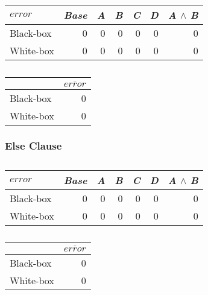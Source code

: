 \begin{table}[H]
\begin{minipage}{.5\linewidth}
    \centering
    \begin{tabular}{lrrrrrr}    \toprule
    $error$     & \emph{Base} & \emph{A} & \emph{B} & \emph{C} & \emph{D} & \emph{A} $\land$ \emph{B}   \\ \midrule
    Black-box & 0 & 0 & 0 & 0 & 0 & 0      \\
    White-box & 0 & 0 & 0 & 0 & 0 & 0      \\ \bottomrule
    \end{tabular}
    \caption{}
\end{minipage}%
\hspace{7mm}
\begin{minipage}{.3\linewidth}
    \centering
    \begin{tabular}{lr}
        \toprule
                  & $\overline{error}$   \\ \midrule
        Black-box & 0              \\
        White-box & 0              \\ \bottomrule
        \end{tabular}  
        \caption{}
    \end{minipage}
\end{table}

\subsubsection*{Else Clause}

\begin{table}[H]
    \begin{minipage}{.5\linewidth}
        \centering
        \begin{tabular}{lrrrrrr}    \toprule
        $error$    & \emph{Base} & \emph{A} & \emph{B} & \emph{C} & \emph{D} & \emph{A} $\land$ \emph{B}   \\ \midrule
        Black-box & 0 & 0 & 0 & 0 & 0 & 0      \\
        White-box & 0 & 0 & 0 & 0 & 0 & 0      \\ \bottomrule
        \end{tabular}
        \caption{}
    \end{minipage}%
    \hspace{7mm}
    \begin{minipage}{.3\linewidth}
        \centering
        \begin{tabular}{lr}
            \toprule
                      & $\overline{error}$   \\ \midrule
            Black-box & 0              \\
            White-box & 0              \\ \bottomrule
            \end{tabular} 
            \caption{}
        \end{minipage}
    \end{table}
    
